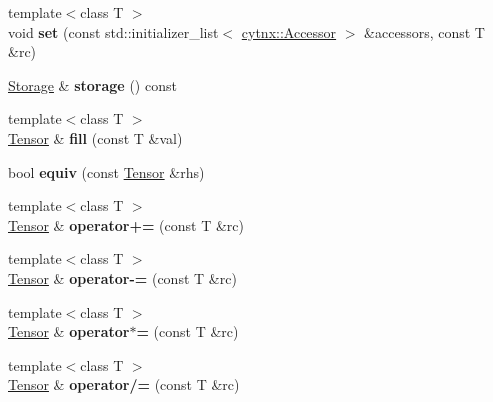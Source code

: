 \begin{DoxyCompactItemize}
\mbox{\label{classcytnx_1_1Tensor_ac04c49c32bd11a66f192ad77b5710e0a}} 
{\footnotesize template$<$class T $>$ }\\void {\bfseries set} (const std\+::initializer\+\_\+list$<$ \hyperlink{classcytnx_1_1Accessor}{cytnx\+::\+Accessor} $>$ \&accessors, const T \&rc)
\item 
\mbox{\label{classcytnx_1_1Tensor_a0fd5918a0f64ebd74fe34cb8b8164c30}} 
\hyperlink{classcytnx_1_1Storage}{Storage} \& {\bfseries storage} () const
\item 
\mbox{\label{classcytnx_1_1Tensor_a674d9dd01d4b523117cf96561de93401}} 
{\footnotesize template$<$class T $>$ }\\\hyperlink{classcytnx_1_1Tensor}{Tensor} \& {\bfseries fill} (const T \&val)
\item 
\mbox{\label{classcytnx_1_1Tensor_aeae314f040e27b581d73c82b33ab6a59}} 
bool {\bfseries equiv} (const \hyperlink{classcytnx_1_1Tensor}{Tensor} \&rhs)
\item 
\mbox{\label{classcytnx_1_1Tensor_a14586eb5096b7c98465dc6081042922b}} 
{\footnotesize template$<$class T $>$ }\\\hyperlink{classcytnx_1_1Tensor}{Tensor} \& {\bfseries operator+=} (const T \&rc)
\item 
\mbox{\label{classcytnx_1_1Tensor_ab78b7d778d79c005ca5cc24385391075}} 
{\footnotesize template$<$class T $>$ }\\\hyperlink{classcytnx_1_1Tensor}{Tensor} \& {\bfseries operator-\/=} (const T \&rc)
\item 
\mbox{\label{classcytnx_1_1Tensor_a9ab679c8ccf4a9b8df95c3a622b98c2c}} 
{\footnotesize template$<$class T $>$ }\\\hyperlink{classcytnx_1_1Tensor}{Tensor} \& {\bfseries operator$\ast$=} (const T \&rc)
\item 
\mbox{\label{classcytnx_1_1Tensor_a7ba77e4d476866efbc330d48f1e6fbef}} 
{\footnotesize template$<$class T $>$ }\\\hyperlink{classcytnx_1_1Tensor}{Tensor} \& {\bfseries operator/=} (const T \&rc)

\end{DoxyCompactItemize}

